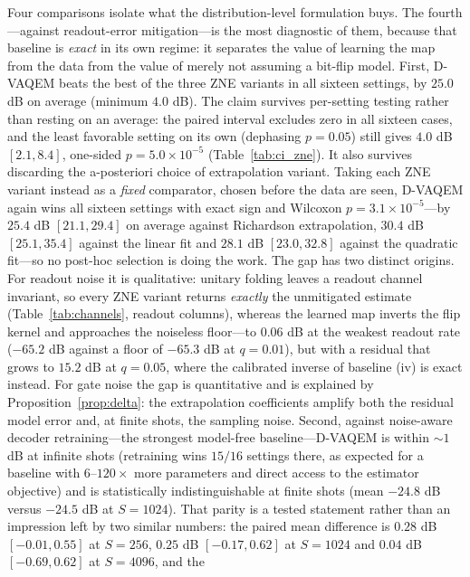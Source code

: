 \documentclass[ASNA,twocolumn]{USG}
\newcommand{\dvaqem}{D-VAQEM}
\begin{document}
Four comparisons isolate what the distribution-level formulation buys.  The
fourth---against readout-error mitigation---is the most diagnostic of them,
because that baseline is \emph{exact} in its own regime: it separates the value
of learning the map from the data from the value of merely not assuming a
bit-flip model.
First, \dvaqem{} beats the best of the three ZNE variants in all sixteen
settings, by $25.0$ dB on average (minimum $4.0$ dB).  The claim survives
per-setting testing rather than resting on an average: the paired interval
excludes zero in all sixteen cases, and the least favorable setting on its own
(dephasing $p=0.05$) still gives $4.0$ dB $[2.1,8.4]$, one-sided
$p=5.0\times10^{-5}$ (Table~\ref{tab:ci_zne}).  It also survives discarding the
a-posteriori choice of extrapolation variant.  Taking each ZNE variant instead
as a \emph{fixed} comparator, chosen before the data are seen, \dvaqem{} again
wins all sixteen settings with exact sign and Wilcoxon
$p=3.1\times10^{-5}$---by $25.4$ dB $[21.1,29.4]$ on average against
Richardson
extrapolation, $30.4$ dB $[25.1,35.4]$ against the linear fit and $28.1$ dB
$[23.0,32.8]$ against the quadratic fit---so no post-hoc selection is doing the
work.  The gap has two distinct
origins.  For readout noise it is qualitative: unitary folding leaves a
readout channel invariant, so every ZNE variant returns \emph{exactly} the
unmitigated estimate (Table~\ref{tab:channels}, readout columns), whereas the
learned map inverts the flip kernel and approaches the noiseless floor---to
$0.06$ dB at the weakest readout rate ($-65.2$ dB against a floor of $-65.3$ dB
at $q=0.01$), but with a residual that grows to $15.2$ dB at $q=0.05$, where
the calibrated inverse of baseline (iv) is exact instead.  For gate noise the gap is
quantitative and is explained by Proposition~\ref{prop:delta}: the
extrapolation coefficients amplify both the residual model error and, at
finite shots, the sampling noise.  Second, against noise-aware decoder
retraining---the strongest model-free baseline---\dvaqem{} is within $\sim1$ dB
at infinite shots (retraining wins $15/16$ settings there, as expected for a
baseline with $6$--$120\times$ more parameters and direct access to the
estimator objective) and is statistically indistinguishable at finite shots
(mean $-24.8$ dB versus $-24.5$ dB at $S=1024$).  That parity is a tested
statement rather than an impression left by two similar numbers: the paired mean
difference is $0.28$ dB $[-0.01,0.55]$ at $S=256$, $0.25$ dB
$[-0.17,0.62]$ at $S=1024$ and $0.04$ dB $[-0.69,0.62]$ at $S=4096$, and the
\end{document}
